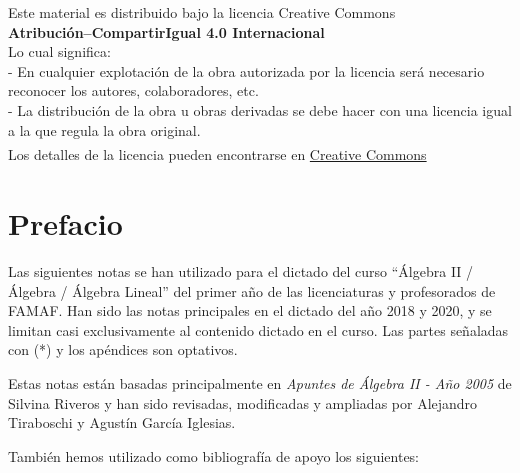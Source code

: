 \documentclass[a4paper,12pt,twoside,spanish,reqno,dottedtoc]{scrbook}
\begin{document}
    

    ${}^{}$\\
    {\flushleft 
        Este material es distribuido bajo la licencia Creative Commons} \\
        \center      \textbf{Atribución--CompartirIgual 4.0 Internacional}
    \\ 
    \center  Lo cual significa: 
    \\
    \flushleft
    - En cualquier explotación de la obra autorizada por la licencia será necesario reconocer los autores, colaboradores, etc.\\
    - La distribución de la obra u obras derivadas se debe hacer con una licencia igual a la que regula la obra original.\\
    ${}^{}$
    \\
    Los detalles de la licencia pueden encontrarse en \href{https://creativecommons.org/licenses/by/4.0/deed.es}{Creative Commons}
    \vskip 1cm 
    \endgroup

    
    
     
    \pagestyle{scrheadings} %
    \cleardoublepage %
    \cleardoublepage
    

    
    \chapter*{Prefacio} 
    
    
    Las siguientes notas se han utilizado para el dictado del curso ``Álgebra II / Álgebra / Álgebra Lineal'' del primer año de las licenciaturas y profesorados de FAMAF.     Han sido las notas principales en el dictado del año 2018 y 2020, y se limitan casi exclusivamente al contenido dictado en el curso. Las partes señaladas con (*) y los apéndices son optativos.
    
    Estas notas están basadas principalmente en \textit{Apuntes de Álgebra II - Año 2005} de Silvina Riveros y han sido revisadas, modificadas y ampliadas por Alejandro Tiraboschi  y Agustín García Iglesias. 
    
    También hemos utilizado como bibliografía de apoyo  los siguientes: 
    
\end{document}
